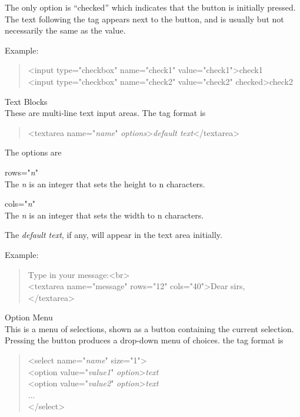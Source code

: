 \begin{description}
The only option is ``{\vt checked}'' which indicates that the button
is initially pressed.  The text following the tag appears next to the
button, and is usually but not necessarily the same as the value.

Example:
\begin{quote}
{\vt <input type="checkbox" name="check1" value="check1">check1}\\
{\vt <input type="checkbox" name="check2" value="check2" checked>check2}
\end{quote}

\item{Text Blocks}\\
These are multi-line text input areas.  The tag format is
\begin{quote}
{\vt <textarea name="{\it name\/}" {\it options\/}>{\it default
    text\/}</textarea>}
\end{quote}

The options are
\begin{description}
\item{\vt rows="{\it n\/}"}\\
The {\it n} is an integer that sets the height to n characters.
\item{\vt cols="{\it n\/}"}\\
The {\it n} is an integer that sets the width to n characters.
\end{description}

The {\it default text\/}, if any, will appear in the text area
initially.

Example:
\begin{quote}
{\vt Type in your message:<br>}\\
{\vt <textarea name="message" rows="12" cols="40">Dear sirs,}\\
{\vt </textarea>}
\end{quote}

\item{Option Menu}\\
This is a menu of selections, shown as a button containing the
current selection.  Pressing the button produces a drop-down menu
of choices.  the tag format is
\begin{quote}
{\vt <select name="{\it name\/}" size="1">}\\
{\vt <option value="{\it value1\/}" {\it option\/}>{\it text}}\\
{\vt <option value="{\it value2\/}"
  {\it option\/}>{\it text}}\\
...\\
{\vt </select>}
\end{quote}


\end{description}
